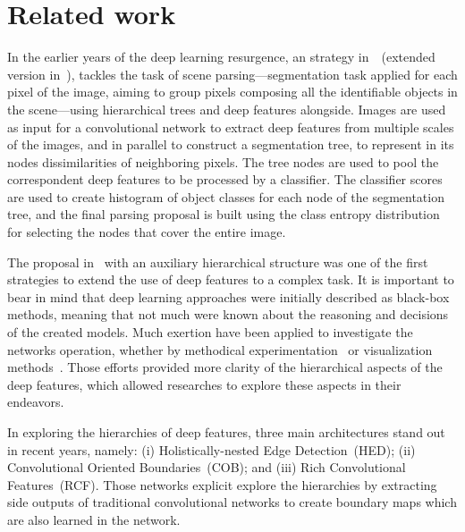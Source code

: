\section{Related work}
\label{sec:related}


In the earlier years of the deep learning resurgence, an strategy in~\cite{farabet2012}~(extended version in~\cite{farabet2013}), tackles the task of scene parsing---segmentation task applied for each pixel of the image, aiming to group pixels composing all the identifiable objects in the scene---using hierarchical trees and deep features alongside. Images are used as input for a convolutional network to extract deep features from multiple scales of the images, and in parallel to construct a segmentation tree, to represent in its nodes dissimilarities of neighboring pixels. The tree nodes are used to pool the correspondent deep features to be processed by a classifier. The classifier scores are used to create histogram of object classes for each node of the segmentation tree, and the final parsing proposal is built using the class entropy distribution for selecting the nodes that cover the entire image.   

The proposal in~\cite{farabet2012} with an auxiliary hierarchical structure was one of the first strategies to extend the use of deep features to a complex task. It is important to bear in mind that deep learning approaches were initially described as black-box methods, meaning that not much were known about the reasoning and decisions of the created models. Much exertion have been applied to investigate the networks operation, whether by methodical experimentation~\cite{ilin17,kuo16,eigen14,zhang17} or visualization methods~\cite{simonyan13,zeiler14,alsallakh18}. Those efforts provided more clarity of the hierarchical aspects of the deep features, which allowed researches to explore these aspects in their endeavors. 

In exploring the hierarchies of deep features, three main architectures stand out in recent years, namely: (i) Holistically-nested Edge Detection~(HED); (ii) Convolutional Oriented Boundaries~(COB); and (iii) Rich Convolutional Features~(RCF). Those networks explicit explore the hierarchies by extracting side outputs of traditional convolutional networks to create boundary maps which are also learned in the network.

